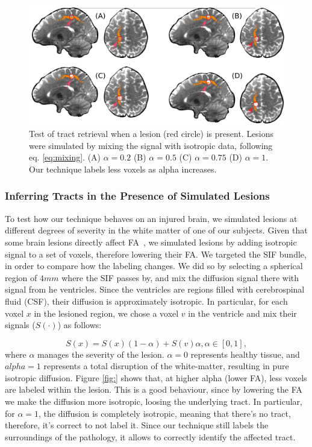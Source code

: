 \begin{figure}[t]
    \includegraphics[width=\textwidth]{7.multiatlas/img/pathology.png}
    \caption{Test of tract retrieval when a lesion (red circle) is present.
             Lesions were simulated by mixing the signal with isotropic data,
             following eq. \ref{eq:mixing}. (A) $\alpha=0.2$
             (B) $\alpha=0.5$ (C) $\alpha=0.75$ (D) $\alpha=1$. Our technique
             labels less voxels as alpha increases.}
    \label{fig:labeling}
\end{figure}

\subsubsection{Inferring Tracts in the Presence of Simulated Lesions}
To test how our technique behaves on an injured brain, we simulated
lesions at different degrees of severity in the white matter of one of our subjects.
Given that some brain lesions directly affect FA~\cite{Schonberg2006, Huisman2009},
we simulated lesions by adding isotropic signal to a set of voxels, therefore
lowering their FA. We targeted the SIF bundle, in order to compare how the labeling
changes. We did so by selecting a spherical region of $4mm$ where the SIF passes by, and mix
the diffusion signal there with signal from he ventricles. Since the ventricles
are regions filled with cerebrospinal fluid (CSF), their diffusion is approximately
isotropic. In particular, for each voxel $x$ in the lesioned region, we chose a
voxel $v$ in the ventricle and mix their signals ($S(\cdot)$) as follows:

\begin{equation}
    \label{eq:mixing}
S(x) = S(x)(1-\alpha) + S(v)\alpha, \alpha \in [0,1],
\end{equation}
where $\alpha$ manages the severity of the lesion. $\alpha=0$ represents healthy
tissue, and $alpha=1$ represents a total disruption of the white-matter,
resulting in pure isotropic diffusion. Figure \ref{fig:} shows that, at higher
alpha (lower FA), less voxels are labeled within the lesion. This is a
good behaviour, since by lowering the FA we make the diffusion more isotropic,
loosing the underlying tract. In particular, for $\alpha=1$, the diffusion
is completely isotropic, meaning that there's no tract, therefore, it's correct
to not label it. Since our technique still labels the surroundings of the
pathology, it allows to correctly identify the affected tract.

